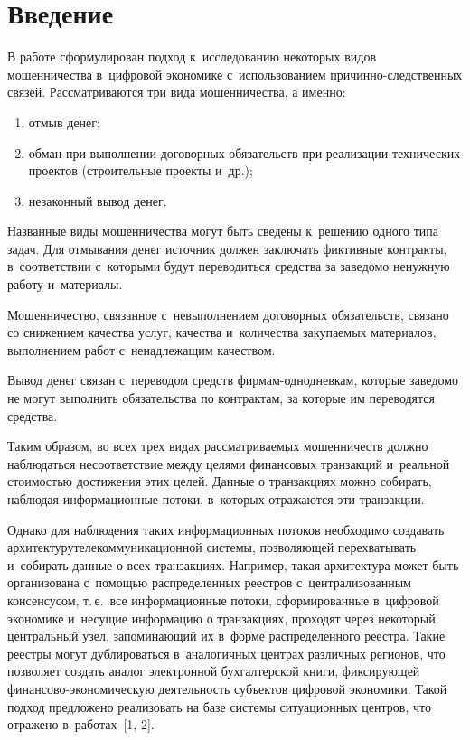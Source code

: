 \begin{multicols}{2}

\label{st\stat}

\section{Введение}

\vspace*{3pt}

  В работе сформулирован подход к~исследованию некоторых видов 
мошенничества в~цифровой экономике с~использованием  
при\-чин\-но-след\-ст\-вен\-ных связей. Рассматриваются три вида мошенничества, 
а именно:
  \begin{enumerate}[(1)]
\item отмыв денег; 
\item обман при выполнении договорных обязательств при реализации 
технических проектов (строительные проекты и~др.); 
\item незаконный вывод денег. 
\end{enumerate}

  Названные виды мошенничества могут быть сведены к~решению одного типа 
задач. Для отмывания денег источник должен заключать фиктивные контракты, 
в~соответствии с~которыми будут переводиться средства за заведомо ненужную 
работу и~материалы. 
  
  Мошенничество, связанное с~невыполнением договорных обязательств, связано 
со снижением качества услуг, качества и~количества закупаемых 
материалов, выполнением работ с~ненадлежащим качеством. 
  
  Вывод денег связан с~переводом средств фир\-мам-од\-но\-днев\-кам, которые 
заведомо не могут выполнить обязательства по контрактам, за которые им 
переводятся средства. 
  
  Таким образом, во всех трех видах рассматриваемых мошенничеств должно 
наблюдаться несоответствие между целями финансовых транзакций и~реальной 
стоимостью достижения этих целей. Данные о транзакциях можно собирать, 
наблюдая информационные потоки, в~которых отражаются эти транзакции. 
  
  Однако для наблюдения таких информационных потоков необходимо создавать 
архитектуру\linebreak телекоммуникационной системы, позволяющей перехватывать 
и~собирать данные о всех транзакциях. Например, такая архитектура может быть 
организована с~помощью распределенных реестров с~централизованным 
консенсусом, т.\,е.\ все информационные потоки, сформированные в~цифровой 
экономике и~несущие информацию о транзакциях, проходят через некоторый 
центральный узел, запоминающий их в~форме распределенного реестра. Такие 
реестры могут дублироваться в~аналогичных центрах различных регионов, что 
позволяет создать аналог электронной бухгалтерской книги, фиксирующей 
фи\-нан\-со\-во-эко\-но\-ми\-че\-скую деятельность субъектов цифровой экономики. Такой 
подход предложено реализовать на базе системы ситуационных центров, что 
отражено в~работах~[1, 2].
  

\end{multicols}
